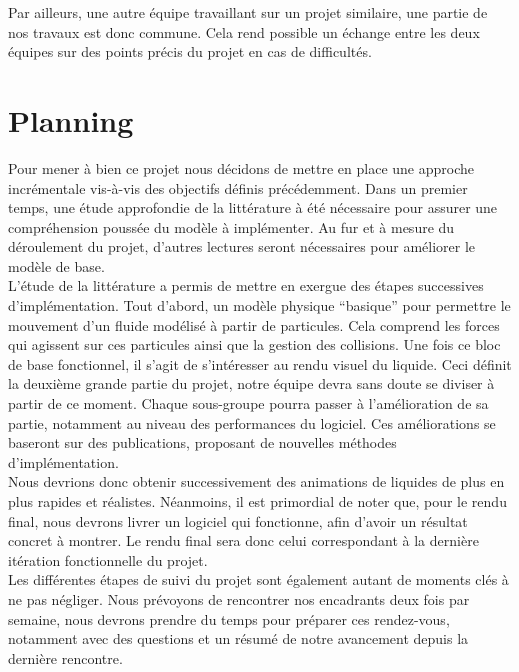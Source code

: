 \documentclass[a4paper,11pt]{article}
\begin{document}
Par ailleurs, une autre équipe travaillant sur un projet similaire, une partie de nos travaux est donc commune. Cela rend possible un échange entre les deux équipes sur des points précis du projet en cas de difficultés.

\section{Planning}

Pour mener à bien ce projet nous décidons de mettre en place une approche incrémentale vis-à-vis des objectifs définis précédemment. Dans un premier temps, une étude approfondie de la littérature à été nécessaire pour assurer une compréhension poussée du modèle à implémenter. Au fur et à mesure du déroulement du projet, d'autres lectures seront nécessaires pour améliorer le modèle de base.\\

L'étude de la littérature a permis de mettre en exergue des étapes successives d'implémentation. Tout d'abord, un modèle physique ``basique'' pour permettre le mouvement d'un fluide modélisé à partir de particules. Cela comprend les forces qui agissent sur ces particules ainsi que la gestion des collisions. Une fois ce bloc de base fonctionnel, il s'agit de s'intéresser au rendu visuel du liquide. Ceci définit la deuxième grande partie du projet, notre équipe devra sans doute se diviser à partir de ce moment. Chaque sous-groupe pourra passer à l'amélioration de sa partie, notamment au niveau des performances du logiciel. Ces améliorations se baseront sur des publications, proposant de nouvelles méthodes d'implémentation.\\

Nous devrions donc obtenir successivement des animations de liquides de plus en plus rapides et réalistes. Néanmoins, il est primordial de noter que, pour le rendu final, nous devrons livrer un logiciel qui fonctionne, afin d'avoir un résultat concret à montrer. Le rendu final sera donc celui correspondant à la dernière itération fonctionnelle du projet.\\

Les différentes étapes de suivi du projet sont également autant de moments clés à ne pas négliger. Nous prévoyons de rencontrer nos encadrants deux fois par semaine, nous devrons prendre du temps pour préparer ces rendez-vous, notamment avec des questions et un résumé de notre avancement depuis la dernière rencontre. \\
\end{document}
